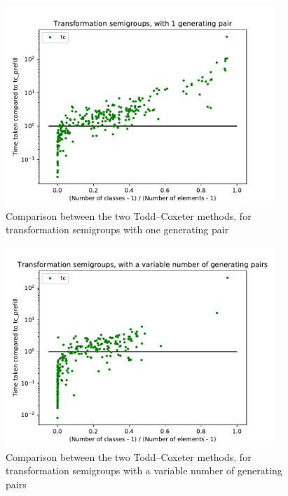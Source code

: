 \begin{figure}[p]
  \centering
  \includegraphics[width=0.9\textwidth]{pics/ch-pairs/bench-trans-tc-1p-tccomp}
  \caption[Benchmark: Todd--Coxeter, concrete, 1 pair]
  {Comparison between the two Todd--Coxeter methods, for transformation
    semigroups with one generating pair}
  \label{fig:bench-trans-tc-1p-tccomp}
\end{figure}

\begin{figure}[p]
  \centering
  \includegraphics[width=0.9\textwidth]{pics/ch-pairs/bench-trans-tc-vp-tccomp}
  \caption[Benchmark: Todd--Coxeter, concrete, $n$ pairs]
  {Comparison between the two Todd--Coxeter methods, for transformation
    semigroups with a variable number of generating pairs}
  \label{fig:bench-trans-tc-vp-tccomp}
\end{figure}

